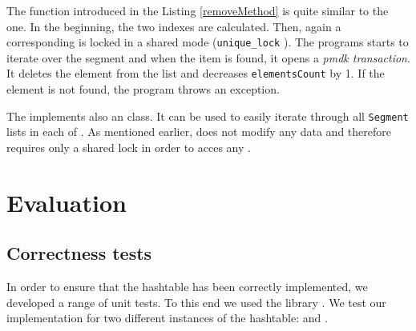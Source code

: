         The \removeMethod function introduced in the Listing \ref{removeMethod} is quite similar to the \getMethod one. 
        In the beginning, the two indexes are calculated. 
        Then, again a corresponding \internalHashMap is locked in a shared mode (\texttt{unique\_lock} \cite{UniqueLock}).
        The programs starts to iterate over the segment and when the item is found, it opens a \textit{pmdk transaction}.
        It deletes the element from the list and decreases \texttt{elementsCount} by 1.
        If the element is not found, the program throws an exception.

        The \NvmHashMap implements also an \Iterator class.
        It can be used to easily iterate through all \texttt{Segment} lists in each of \internalHashMaps.
        As mentioned earlier, \Iterator does not modify any data and therefore requires only a shared lock in order to acces any \internalHashMap.
        
        
\section{Evaluation}

\subsection{Correctness tests}
 
In order to ensure that the hashtable has been correctly implemented, we developed a range of unit tests. 
To this end we used the \GoogleTest library \cite{GoogleTest}. 
We test our implementation for two different instances of the hashtable: \integersMap and \stringsMap.
    

